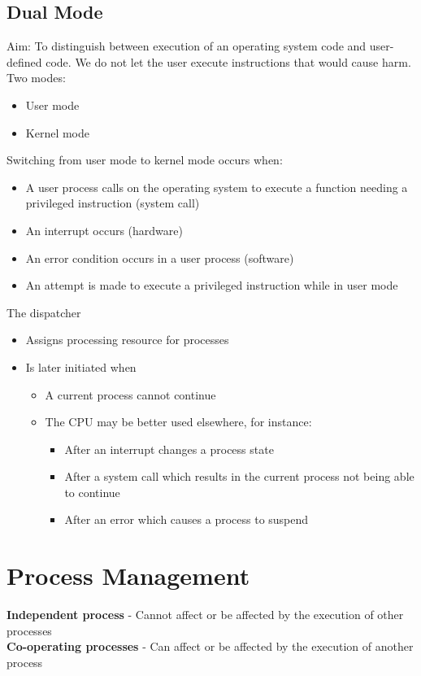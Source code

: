 \documentclass{article}[18pt]
\begin{document}
\subsection{Dual Mode}
Aim: To distinguish between execution of an operating system code and user-defined code. We do not let the user execute instructions that would cause harm.\\
Two modes:
\begin{itemize}
	\item User mode
	\item Kernel mode
\end{itemize}
Switching from user mode to kernel mode occurs when:
\begin{itemize}
	\item A user process calls on the operating system to execute a function needing a privileged instruction (system call)
	\item An interrupt occurs (hardware)
	\item An error condition occurs in a user process (software)
	\item An attempt is made to execute a privileged instruction while in user mode
\end{itemize} 
The dispatcher
\begin{itemize}
	\item Assigns processing resource for processes
	\item Is later initiated when
	\begin{itemize}
		\item A current process cannot continue
		\item The CPU may be better used elsewhere, for instance:
		\begin{itemize}
			\item After an interrupt changes a process state
			\item After a system call which results in the current process not being able to continue
			\item After an error which causes a process to suspend
		\end{itemize}
	\end{itemize}
\end{itemize}
\section{Process Management}
\textbf{Independent process} - Cannot affect or be affected by the execution of other processes\\
\textbf{Co-operating processes} - Can affect or be affected by the execution of another process
\end{document}

